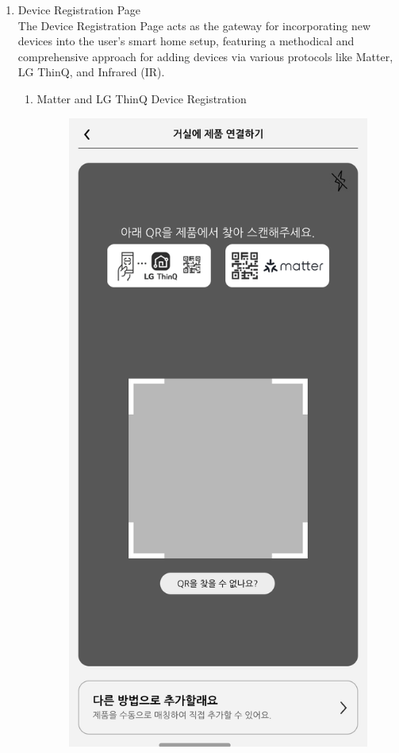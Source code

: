\documentclass[conference]{IEEEtran}
\begin{document}
\begin{enumerate}[label=\arabic*.]
\item Device Registration Page\\
The Device Registration Page acts as the gateway for incorporating new devices into the user's smart home setup, featuring a methodical and comprehensive approach for adding devices via various protocols like Matter, LG ThinQ, and Infrared (IR).\\
\begin{enumerate}[label=\alph*.]
\item Matter and LG ThinQ Device Registration\\
\begin{figure}[H]\centering \includegraphics[scale=0.35]{images/sw-spec-11.png}\end{figure}

\end{enumerate}
\end{enumerate}
\end{document}
